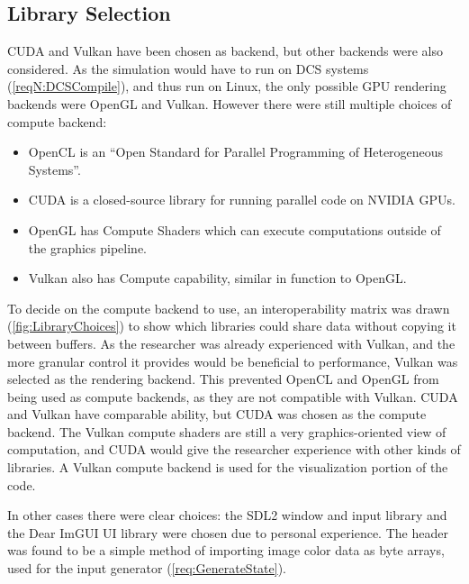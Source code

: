 \subsection{Library Selection}
\label{sec:LibrarySelection}

CUDA and Vulkan have been chosen as backend, but other backends were also considered.
As the simulation would have to run on DCS systems (\cref{reqN:DCSCompile}), and thus run on Linux, the only possible GPU rendering backends were OpenGL and Vulkan.
However there were still multiple choices of compute backend:
\begin{itemize}
    \item OpenCL\cite{tool:OpenCL1.0PressRelease} is an ``Open Standard for Parallel Programming of Heterogeneous Systems''\cite{TheKhronosGroupOpenCLInc}.
    \item CUDA\cite{tool:CUDA} is a closed-source library for running parallel code on NVIDIA GPUs.
    \item OpenGL has Compute Shaders\cite{tool:OpenGLComputeShaderExt} which can execute computations outside of the graphics pipeline.
    \item Vulkan also has Compute capability\cite{TheKhronosGroupVulkanGuide}, similar in function to OpenGL.
\end{itemize}
To decide on the compute backend to use, an interoperability matrix was drawn (\cref{fig:LibraryChoices}) to show which libraries could share data without copying it between buffers.
As the researcher was already experienced with Vulkan, and the more granular control it provides would be beneficial to performance, Vulkan was selected as the rendering backend.
This prevented OpenCL and OpenGL from being used as compute backends, as they are not compatible with Vulkan.
CUDA and Vulkan have comparable ability, but CUDA was chosen as the compute backend.
The Vulkan compute shaders are still a very graphics-oriented view of computation, and CUDA would give the researcher experience with other kinds of libraries.
A Vulkan compute backend is used for the visualization portion of the code.


In other cases there were clear choices: the SDL2\cite{SimpleHomepage} window and input library and the Dear ImGUI\cite{CornutDearImGui} UI library were chosen due to personal experience.
The  header was found to be a simple method of importing image color data as byte arrays, used for the input generator (\cref{req:GenerateState}).

